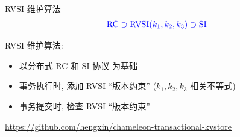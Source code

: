 \begin{frame}{RVSI 维护算法}
  \[
    \textcolor{blue}{\text{RC} \supset \text{RVSI}(k_1, k_2, k_3) \supset \text{SI}}
  \]

  \vspace{0.10cm}

  RVSI 维护算法:
  \begin{itemize}
    \item 以分布式 RC 和 SI 协议 为基础
    \item 事务执行时, 添加 RVSI ``版本约束'' ($k_1, k_2, k_3$ 相关不等式)
    \item 事务提交时, 检查 RVSI ``版本约束''
  \end{itemize}

  \textcolor{red}{\small \url{https://github.com/hengxin/chameleon-transactional-kvstore}}
\end{frame}
